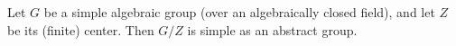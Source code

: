 Let $G$ be a simple algebraic group (over an algebraically closed field), and let $Z$ be its (finite) center. Then $G/Z$ is simple as an abstract group.

